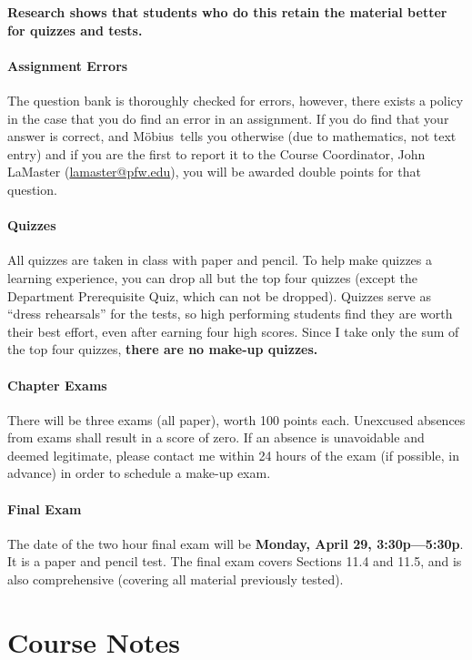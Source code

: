 \documentclass[letterpaper,twoside]{article}
\def\Mobius{M\"obius\ }
\begin{document}
\begin{multicols*}{2}
    \textbf{Research shows that students who do this retain the material better for quizzes and tests.}

    \paragraph{Assignment Errors}
    The question bank is thoroughly checked for errors, however, there exists a policy in the case that you do find an error in an assignment.
    If you do find that your answer is correct, and \Mobius tells you otherwise (due to mathematics, not text entry) and if you are the first to report it to the Course Coordinator, John LaMaster (\href{mailto:lamaster@pfw.edu}{lamaster@pfw.edu}), you will be awarded double points for that question.

    \paragraph{Quizzes}
    All quizzes are taken in class with paper and pencil.
    To help make quizzes a learning experience, you can drop all but the top four quizzes (except the Department Prerequisite Quiz, which can not be dropped).
    Quizzes serve as ``dress rehearsals'' for the tests, so high performing students find they are worth their best effort, even after earning four high scores.
    Since I take only the sum of the top four quizzes, \textbf{there are no make-up quizzes.}

    \paragraph{Chapter Exams}
    There will be three exams (all paper), worth 100 points each.
    Unexcused absences from exams shall result in a score of zero.
    If an absence is unavoidable and deemed legitimate, please contact me within 24 hours of the exam (if possible, in advance) in order to schedule a make-up exam.

    \paragraph{Final Exam}
    The date of the two hour final exam will be \textbf{Monday, April 29, 3:30p---5:30p}.
    It is a paper and pencil test.
    The final exam covers Sections 11.4 and 11.5, and is also comprehensive (covering all material previously tested).

    \section*{Course Notes}


\end{multicols*}
\end{document}
